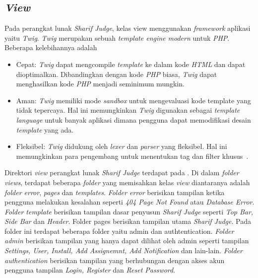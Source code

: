 \subsection{\textit{View}}
Pada perangkat lunak \textit{\textit{Sharif Judge}}, kelas view menggunakan \textit{framework} aplikasi yaitu \textit{Twig}. \textit{Twig} merupakan sebuah \textit{template engine modern} untuk \textit{PHP}. Beberapa kelebihannya adalah
\begin{itemize}
	\item Cepat: \textit{Twig} dapat mengcompile \textit{template} ke dalam kode \textit{HTML} dan dapat dioptimalkan. Dibandingkan dengan kode \textit{PHP} biasa, \textit{Twig} dapat menghasilkan kode \textit{PHP} menjadi seminimum mungkin.
	\item Aman: \textit{Twig} memiliki mode \textit{sandbox} untuk mengevaluasi kode template yang tidak tepercaya. Hal ini memungkinkan \textit{Twig} digunakan sebagai \textit{template language} untuk banyak aplikasi dimana pengguna dapat memodifikasi desain \textit{template} yang ada.
	\item Fleksibel: \textit{Twig} didukung oleh \textit{lexer} dan \textit{parser} yang fleksibel. Hal ini memungkinkan para pengembang untuk menentukan tag dan filter khusus~\cite{fabien:09:twig}.
\end{itemize}

Direktori \textit{view} perangkat lunak \textit{Sharif Judge} terdapat pada . Di dalam \textit{folder views}, terdapat beberapa \textit{folder} yang memisahkan kelas \textit{view} diantaranya adalah \textit{folder error}, \textit{pages} dan \textit{templates}. \textit{Folder error} berisikan tampilan ketika pengguna melakukan kesalahan seperti\textit{ 404 Page Not Found} atau \textit{Database Error}. \textit{Folder template} berisikan tampilan dasar penyusun \textit{Sharif Judge} seperti \textit{Top Bar, Side Bar} dan \textit{Header}. Folder pages berisikan tampilan utama \textit{\textit{Sharif Judge}}. Pada folder ini terdapat beberapa folder yaitu admin dan authtentication. \textit{Folder admin} berisikan tampilan yang hanya dapat dilihat oleh admin seperti tampilan \textit{Settings, User, Install, Add Assignemnt, Add Notification} dan lain-lain. \textit{Folder authentication} berisikan tampilan yang berhubungan dengan akses akun pengguna tampilan \textit{Login, Register} dan \textit{Reset Password}.

